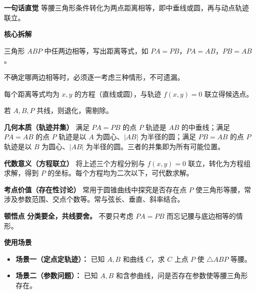 \begin{explanationbox}
	\textbf{\textcolor{CExplanation}{一句话直觉}}
	等腰三角形条件转化为两点距离相等，即中垂线或圆，再与动点轨迹联立。

	\medskip
	\textbf{\textcolor{CExplanation}{核心拆解}}
	\begin{description}[style=nextline, leftmargin=2.8em, labelsep=0.5em, itemsep=0.45em]
		\item[\textbf{要点一（等腰条件转化）：}]
			三角形 $ABP$ 中任两边相等，写出距离等式，如 $PA=PB$，$PA=AB$，$PB=AB$。
		\item[\textbf{要点二（三种分类）：}]
			不确定哪两边相等时，必须逐一考虑三种情形，不可遗漏。
		\item[\textbf{要点三（联立求解）：}]
			每个距离等式均为 $x,y$ 的方程（直线或圆），与轨迹 $f(x,y)=0$ 联立得候选点。
		\item[\textbf{要点四（排除共线）：}]
			若 $A,B,P$ 共线，则退化，需剔除。
	\end{description}

	\medskip
	\textbf{\textcolor{CExplanation}{几何本质（轨迹并集）}}
	满足 $PA=PB$ 的点 $P$ 轨迹是 $AB$ 的中垂线；满足 $PA=AB$ 的点 $P$ 轨迹是以 $A$ 为圆心、$|AB|$ 为半径的圆；满足 $PB=AB$ 的点 $P$ 轨迹是以 $B$ 为圆心、$|AB|$ 为半径的圆。三者的并集即为所有可能位置。

	\medskip
	\textbf{\textcolor{CExplanation}{代数意义（方程联立）}}
	将上述三个方程分别与 $f(x,y)=0$ 联立，转化为方程组求解，得到 $P$ 的坐标。每个方程均为二次以下，可代数求解。

	\medskip
	\textbf{\textcolor{CExplanation}{考点价值（存在性讨论）}}
	常用于圆锥曲线中探究是否存在点 $P$ 使三角形等腰，常涉及参数范围、交点个数等。常与弦长、垂直、斜率结合。

	\medskip
	\textbf{\textcolor{CExplanation}{顿悟点}}
	\textbf{分类要全，共线要舍。} 不要只考虑 $PA=PB$ 而忘记腰与底边相等的情形。

	\medskip
	\textbf{\textcolor{CExplanation}{使用场景}}
	\begin{itemize}[leftmargin=*, itemsep=0.5em, topsep=0.4em]
		\item \textbf{场景一（定点定轨迹）：} 已知 $A,B$ 和曲线 $C$，求 $C$ 上点 $P$ 使 $\triangle ABP$ 等腰。
		\item \textbf{场景二（参数问题）：} 已知 $A,B$ 和含参曲线，问是否存在参数使等腰三角形存在。
	\end{itemize}

\end{explanationbox}

